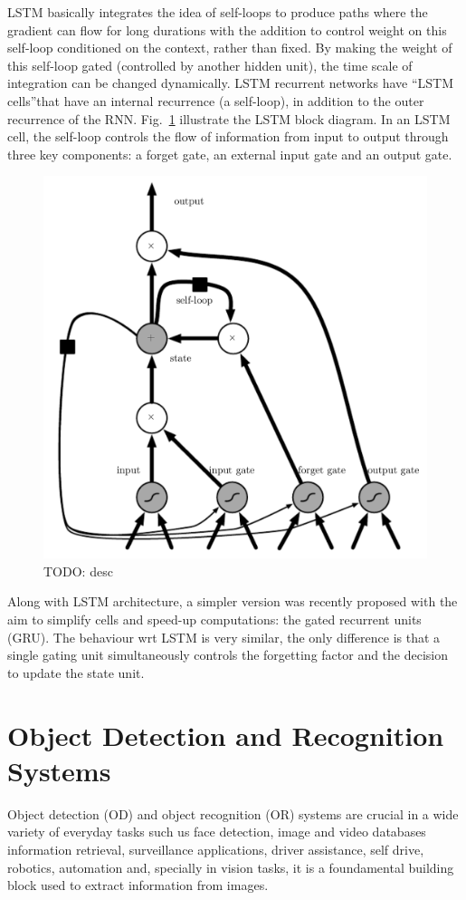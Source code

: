 LSTM basically integrates the idea of self-loops to produce paths
where the gradient can ﬂow for long durations with the addition to
control weight on this self-loop conditioned on the context, rather
than ﬁxed. By making the weight of this self-loop gated (controlled by
another hidden unit), the time scale of integration can be changed
dynamically. LSTM recurrent networks have ``LSTM cells''that have an
internal recurrence (a self-loop), in addition to the outer recurrence
of the RNN. Fig.~\ref{fig:lstm} illustrate the LSTM block diagram. In
an LSTM cell, the self-loop controls the flow of information from
input to output through three key components: a forget gate, an
external input gate and an output gate.

\begin{figure}
  \centering
  \includegraphics[width=.6\textwidth]{figures/lstm.png}
  \caption[TODO]{TODO: desc}
  \label{fig:lstm}
\end{figure}

Along with LSTM architecture, a simpler version was recently proposed
with the aim to simplify cells and speed-up computations: the gated
recurrent units (GRU). The behaviour wrt LSTM is very similar, the
only difference is that a single gating unit simultaneously controls
the forgetting factor and the decision to update the state unit.

\section{Object Detection and Recognition Systems}
\label{sec:object-detection-recognition}

Object detection (OD) and object recognition (OR) systems are crucial
in a wide variety of everyday tasks such us face detection, image and
video databases information retrieval, surveillance applications,
driver assistance, self drive, robotics, automation and, specially in
vision tasks, it is a foundamental building block used to extract
information from images.

